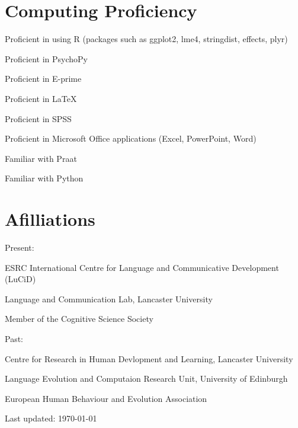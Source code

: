 \documentclass[letterpaper]{article}
\def\footerlink{}
\renewenvironment{itemize}{
  \begin{list}{}{
    \setlength{\leftmargin}{1.5em}
  }
}{
  \end{list}
}
\begin{document}
\section*{Computing Proficiency}
\begin{itemize}
\item Proficient in using R (packages such as ggplot2, lme4, stringdist, effects, plyr)
\item Proficient in PsychoPy
\item Proficient in E-prime
\item Proficient in LaTeX
\item Proficient in SPSS
\item Proficient in Microsoft Office applications (Excel, PowerPoint, Word)
\item Familiar with Praat
\item Familiar with Python
\end{itemize}

\section*{Afilliations}
\begin{itemize}
\item Present:
\item ESRC International Centre for Language and Communicative Development (LuCiD)
\item Language and Communication Lab, Lancaster University
\item Member of the Cognitive Science Society
\\
\item Past:
\item Centre for Research in Human Devlopment and Learning, Lancaster University
\item Language Evolution and Computaion Research Unit, University of Edinburgh
\item European Human Behaviour and Evolution Association
\end{itemize}


\bigskip

\begin{center}
  \begin{footnotesize}
    Last updated: \today \\
    \href{\footerlink}{\texttt{\footerlink}}
  \end{footnotesize}
\end{center}
\end{document}
